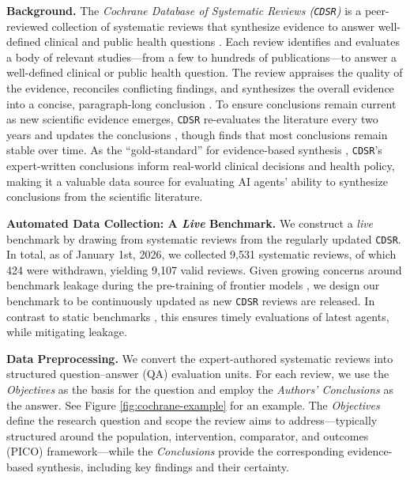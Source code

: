 \documentclass{article}
\newcommand{\xhdr}[1]{%
  \noindent\textbf{#1.}
}
\begin{document}
\xhdr{Background}\label{sec:background}
The \textit{Cochrane Database of Systematic Reviews (\texttt{CDSR})} is a peer-reviewed collection of systematic reviews that synthesize evidence to answer well-defined clinical and public health questions \citep{cochrane_cdsr_about}. Each review identifies and evaluates a body of relevant studies---from a few to hundreds of publications---to answer a well-defined clinical or public health question.
The review appraises the quality of the evidence, reconciles conflicting findings, and synthesizes the overall evidence into a concise, paragraph-long conclusion \citep{hevia-etal-2025-roboto2, cochrane_methodology_guide_2025, cochrane2026gradeing}. To ensure conclusions remain current as new scientific evidence emerges, \texttt{CDSR} re-evaluates the literature every two years and updates the conclusions \citep{CochraneHandbook2024ChapterIV}, though \citet{french2005investing} finds that most conclusions remain stable over time. As the ``gold-standard'' for evidence-based synthesis \cite{smith2013cochrane}, \texttt{CDSR}'s expert-written conclusions inform real-world clinical decisions and health policy, making it a valuable data source for evaluating AI agents' ability to synthesize conclusions from the scientific literature.


\xhdr{Automated Data Collection: A \textit{Live} Benchmark}\label{sec:data-collection}
We construct a \textit{live} benchmark by drawing from systematic reviews from the regularly updated \texttt{CDSR}. In total, as of January 1st, 2026, we collected 9,531 systematic reviews, of which 424 were withdrawn, yielding 9,107 valid reviews.
Given growing concerns around benchmark leakage during the pre-training of frontier models \cite{xu2024benchmarking}, we design our benchmark to be continuously updated as new \texttt{CDSR} reviews are released.
In contrast to static benchmarks \citep{arora2025healthbench, li2025reportbenchevaluatingdeepresearch, mialon2023gaia}, this ensures timely evaluations of latest agents, while mitigating leakage.

\xhdr{Data Preprocessing}\label{sec:preprocessing}
We convert the expert-authored systematic reviews into structured question–answer (QA) evaluation units. For each review, we use the \textit{Objectives} as the basis for the question and employ the \textit{Authors' Conclusions} as the answer. See Figure \ref{fig:cochrane-example} for an example. The  \textit{Objectives} define the research question and scope the review aims to address---typically structured around the population, intervention, comparator, and outcomes (PICO) framework---while the \textit{Conclusions} provide the corresponding evidence-based synthesis, including key findings and their certainty.
\end{document}
